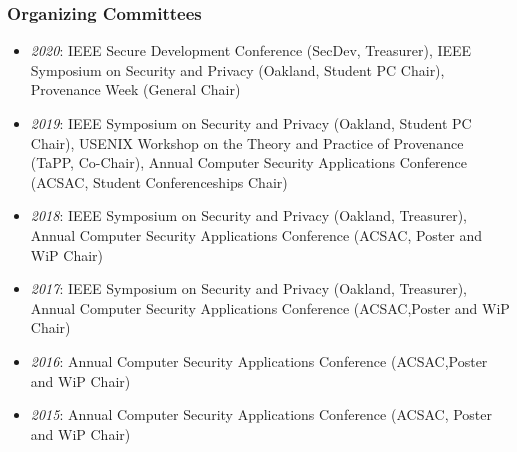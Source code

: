 \hypertarget{organizing-committees}{%
\subsubsection{Organizing Committees}\label{organizing-committees}}
\begin{itemize}
\tightlist
\item
  \emph{2020}: IEEE Secure Development Conference (SecDev, Treasurer),
  IEEE Symposium on Security and Privacy (Oakland, Student PC Chair),
  Provenance Week (General Chair)
\item
  \emph{2019}: IEEE Symposium on Security and Privacy (Oakland, Student PC Chair),
  USENIX Workshop on the Theory and Practice of Provenance (TaPP, Co-Chair),
  Annual Computer Security Applications Conference (ACSAC, Student Conferenceships Chair)
\item
  \emph{2018}: IEEE Symposium on Security and Privacy (Oakland, Treasurer),
  Annual Computer Security Applications Conference (ACSAC, Poster and WiP Chair)
\item
  \emph{2017}: IEEE Symposium on Security and Privacy (Oakland, Treasurer),
  Annual Computer Security Applications Conference (ACSAC,Poster and WiP Chair)
\item
  \emph{2016}: Annual Computer Security Applications Conference (ACSAC,Poster and WiP Chair)
\item
  \emph{2015}: Annual Computer Security Applications Conference (ACSAC, Poster and WiP Chair)
\end{itemize}

